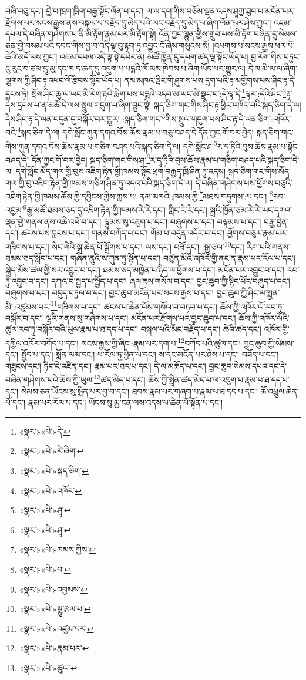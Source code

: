 བཞི་བཅུ་དང་། བྱེ་བ་ཁྲག་ཁྲིག་བརྒྱ་སྟོང་ལོན་པ་དང་། ལ་ལ་དག་གིས་བཅོམ་ལྡན་འདས་ཤཱཀྱ་ཐུབ་པ་མངོན་པར་རྫོགས་པར་སངས་རྒྱས་ནས་བསྐལ་པ་བརྗོད་དུ་མེད་པའི་ཡང་བརྗོད་དུ་མེད་པ་ཞིག་ལོན་པར་ཤེས་ཀྱང་། འཇམ་དཔལ་དེ་བཞིན་གཤེགས་པ་ནི་མི་རྟོག་རྣམ་པར་མི་རྟོག་སྟེ། འོན་ཀྱང་ལྷུན་གྱིས་གྲུབ་པས་མི་རྟོག་བཞིན་དུ་སེམས་ཅན་གྱི་བསམ་པའི་དབང་གིས་བྱ་བ་འདི་ལྟ་བུ་རྟག་ཏུ་འབྱུང་ངོ་ཞེས་གསུངས་སོ། །འཕགས་པ་སངས་རྒྱས་ཕལ་པོ་ཆེའི་མདོ་ལས་ཀྱང་། འཇམ་དཔལ་འདི་ལྟ་སྟེ་དཔེར་ན། མཚོ་ཁྱོན་དུ་དཔག་ཚད་ལྔ་སྟོང་ཡོད་པ། བྱ་རོག་གིས་བཏུང་ངུ་རུང་བ་ཙམ་དུ་མུ་དང་ཁ་ད་ཆད་དུ་འདུག་པ་པདྨའི་ལོ་མས་ཁེབས་པ་ཞིག་ཡོད་པར་གྱུར་ལ། དེ་ལ་མི་ལ་ལ་ཞིག་ལྕགས་ཀྱི་ཤིང་རྟ་འཕང་ལོ་རྩིབས་སྟོང་ཡོད་པ། ནམ་མཁའ་ལྡིང་གི་ཤུགས་པས་དྲག་པའི་རྟ་མགྱོགས་པས་ཤིང་རྟ་དེ་དྲངས་ཏེ། སྲོག་ཤིང་ཆུ་ལ་ཡང་མི་རེག་རྟའི་རྨིག་པས་པདྨའི་འདབ་མ་ཡང་མི་སྣང་བ་:དེ་ལྟ་དེ་\footnote{«སྣར་»«པེ་»དེ་}ལྟར་:དེའི་ཤིང་\footnote{«སྣར་»«པེ་»རེ་ཞིག་}རྟ་དེས་དྲངས་པ་ན་མཚོ་དེ་ལས་སྦྲུལ་གདུག་པ་ཞིག་བྱུང་སྟེ། སྐད་ཅིག་གང་གིས་ཤིང་རྟ་ཕྱིར་འཁོར་བའི་སྐད་ཅིག་དེ་ལ། དེས་ཤིང་རྟ་དེ་ལན་བདུན་དུ་བསྐོར་བར་གྱུར། :སྐད་ཅིག་གང་\footnote{«སྣར་»«པེ་»སྐད་ཅིག་}གིས་སྦྲུལ་གདུག་པས་ཤིང་རྟ་དེ་ལན་ཅིག་:འཁོར་བའི་\footnote{«སྣར་»«པེ་»འཁོར་}སྐད་ཅིག་དེ་ལ། དགེ་སློང་ཀུན་དགའ་བོས་ཆོས་རྣམ་པ་བཅུ་བཤད་དེ་དོན་ཀྱང་གོ་བར་བྱེད། སྐད་ཅིག་གང་གིས་ཀུན་དགའ་བོས་ཆོས་རྣམ་པ་གཅིག་བཤད་པའི་སྐད་ཅིག་དེ་ལ། དགེ་སློང་ཤ་\footnote{«སྣར་»«པེ་»ཤཱ་}ར་དྭ་ཏིའི་བུས་ཆོས་རྣམ་པ་སྟོང་བཤད་དེ། དོན་ཀྱང་གོ་བར་བྱེད། སྐད་ཅིག་གང་གིས་ཤ་\footnote{«སྣར་»«པེ་»ཤཱ་}ར་དྭ་ཏིའི་བུས་ཆོས་རྣམ་པ་གཅིག་བཤད་པའི་སྐད་ཅིག་དེ་ལ། དགེ་སློང་མཽད་གལ་གྱི་བུས་འཇིག་རྟེན་གྱི་ཁམས་སྟོང་ཕྲག་བརྒྱད་ཁྲི་ཤིན་ཏུ་འདས། སྐད་ཅིག་གང་གིས་མཽད་གལ་གྱི་བུ་འཇིག་རྟེན་གྱི་ཁམས་གཅིག་ཤིན་ཏུ་འདའ་བའི་སྐད་ཅིག་དེ་ལ། དེ་བཞིན་གཤེགས་པས་ཕྱོགས་བཅུའི་འཇིག་རྟེན་གྱི་ཁམས་ཆོས་ཀྱི་དབྱིངས་ཀྱིས་ཀླས་པ། ནམ་མཁའི་:ཁམས་ཀྱི་\footnote{«སྣར་»«པེ་»ཁམས་ཀྱིས་}མཐས་གཏུགས་:པ་དང་། \footnote{«སྣར་»«པེ་»པ་}རབ་འབྱམ་\footnote{«སྣར་»«པེ་»འབྱམས་}རྒྱ་མཚོ་ཐམས་ཅད་དུ་འཇིག་རྟེན་གྱི་ཁམས་རེ་རེ་དང་། གླིང་རེ་རེ་དང་། སྐྲའི་ཁྱོན་ཙམ་རེ་རེ་ཡང་དགའ་ལྡན་གྱི་གནས་ནས་འཆི་འཕོ་བ་དང་། ལྷུམས་སུ་འཇུག་པ་དང་། བཞུགས་པ་དང་། བལྟམས་པ་དང་། བརྒྱ་བྱིན་དང་། ཚངས་པས་བླངས་པ་དང་། གནས་བཀོད་པ་དང་། གོམ་པ་བདུན་འདོར་བ་དང་། ཕྱོགས་བཅུར་རྣམ་པར་གཟིགས་པ་དང་། སེང་གེའི་སྒྲ་ཆེན་པོ་སྒྲོགས་པ་དང་། ལས་དང་། བཟོ་དང་། :སྒྱུ་ཙལ་\footnote{«སྣར་»«པེ་»སྒྱུ་རྩལ་པ་}དང་། རིག་པའི་གནས་ཐམས་ཅད་སློབ་པ་དང་། གཞོན་ནུའི་ས་ཀུན་ཏུ་སྟོན་པ་དང་། བཙུན་མོའི་འཁོར་གྱི་ནང་ན་རྣམ་པར་རོལ་པ་དང་། སྐྱེད་མོས་ཚལ་གྱི་སར་འབྱུང་བ་དང་། ཐམས་ཅད་མཁྱེན་པ་ཉིད་ལ་ཕྱོགས་པ་དང་། མངོན་པར་འབྱུང་བ་དང་། རབ་ཏུ་འབྱུང་བ་དང་། དཀའ་བ་སྤྱད་པ་སྤྱོད་པ་དང་། ཞལ་ཟས་གསོལ་བ་དང་། བྱང་ཆུབ་ཀྱི་སྙིང་པོར་བཞུད་པ་དང་། བཞུགས་པ་དང་། བདུད་བཏུལ་བ་དང་། བྱང་ཆུབ་མངོན་པར་སངས་རྒྱས་པ་དང་། བྱང་ཆུབ་ཀྱི་ཤིང་ལ་སྤྱན་མི་:འཛུམས་པར་\footnote{«སྣར་»«པེ་»འཛུམ་པར་}གཟིགས་པ་དང་། ཚངས་པ་ཆེན་པོས་གསོལ་བ་བཏབ་པ་དང་། ཆོས་ཀྱི་འཁོར་ལོ་རབ་ཏུ་བསྐོར་བ་དང་། ལྷའི་གནས་སུ་གཤེགས་པ་དང་། མངོན་པར་རྫོགས་པར་བྱང་ཆུབ་པ་དང་། ཆོས་ཀྱི་འཁོར་ལོའི་ཚུལ་རབ་ཏུ་བསྐོར་བའི་ཡུལ་རྣམ་པ་ཐ་དད་པ་དང་། བསྐལ་པའི་མིང་བརྗོད་པ་དང་། ཚེའི་ཚད་དང་། འཁོར་གྱི་དཀྱིལ་འཁོར་བཀོད་པ་དང་། སངས་རྒྱས་ཀྱི་ཞིང་:རྣམ་པར་དག་པ་\footnote{«སྣར་»«པེ་»རྣམ་པར་}བཀོད་པའི་ཚུལ་དང་། བྱང་ཆུབ་ཀྱི་སེམས་དང་། སྤྱོད་པ་དང་། སྨོན་ལམ་དང་། ཕ་རོལ་ཏུ་ཕྱིན་པ་དང་། ས་དང་མངོན་པར་ཤེས་པ་དང་། བཟོད་པ་དང་། གཟུངས་དང་། ཏིང་ངེ་འཛིན་དང་། རྣམ་པར་ཐར་པ་དང་། དེ་ལ་མཆོད་པ་དང་། བྱང་ཆུབ་སེམས་དཔའ་དང་དེ་བཞིན་གཤེགས་པའི་ཆོས་ཀྱི་ཡུལ་\footnote{«སྣར་»«པེ་»ཚུལ་}ཚད་མེད་པ་དང་། ཆོས་ཀྱི་སྤྲིན་ཚད་མེད་པ་ལ་འཇུག་པ་རྣམ་པ་ཐ་དད་པ་དང་། སེམས་ཅན་ཡོངས་སུ་སྨིན་པར་བྱ་བ་དང་། ཐབས་རྣམ་པར་གཞག་པ་རྣམ་པ་ཐ་དད་པ་དང་། ཆོ་འཕྲུལ་ཆེན་པོ་དང་། རྣམ་པར་རོལ་པ་དང་། ཡོངས་སུ་མྱ་ངན་ལས་འདས་པ་ཆེན་པོ་སྟོན་པ་དང་། 